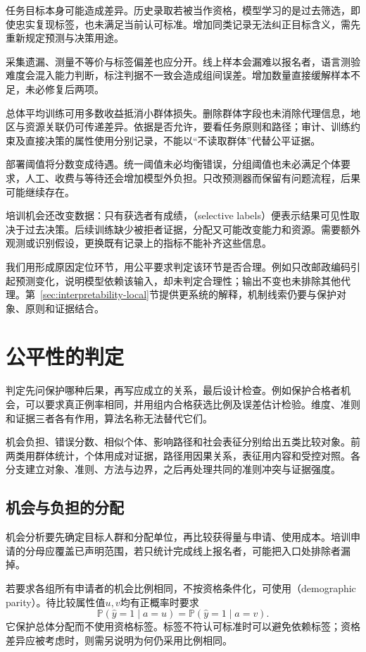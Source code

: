 任务目标本身可能造成差异。历史录取若被当作资格，模型学习的是过去筛选，即使忠实复现标签，也未满足当前认可标准。增加同类记录无法纠正目标含义，需先重新规定预测与决策用途。

采集遗漏、测量不等价与标签偏差也应分开。线上样本会漏难以报名者，语言测验难度会混入能力判断，标注判据不一致会造成组间误差。增加数量直接缓解样本不足，未必修复后两项。

总体平均训练可用多数收益抵消小群体损失。删除群体字段也未消除代理信息，地区与资源关联仍可传递差异。依据是否允许，要看任务原则和路径；审计、训练约束及直接决策的属性使用分别记录，不能以“不读取群体”代替公平证据。

部署阈值将分数变成待遇。统一阈值未必均衡错误，分组阈值也未必满足个体要求，人工、收费与等待还会增加模型外负担。只改预测器而保留有问题流程，后果可能继续存在。

培训机会还改变数据：只有获选者有成绩，（selective labels）便表示结果可见性取决于过去决策。后续训练缺少被拒者证据，分配又可能改变能力和资源。需要额外观测或识别假设，更换既有记录上的指标不能补齐这些信息。

我们用形成原因定位环节，用公平要求判定该环节是否合理。例如只改邮政编码引起预测变化，说明模型依赖该输入，却未判定合理性；输出不变也未排除其他代理。第~\ref{sec:interpretability-local}节提供更系统的解释，机制线索仍要与保护对象、原则和证据结合。

\section{公平性的判定}
\label{sec:fairness-criteria}

判定先问保护哪种后果，再写应成立的关系，最后设计检查。例如保护合格者机会，可以要求真正例率相同，并用组内合格获选比例及误差估计检验。维度、准则和证据三者各有作用，算法名称无法替代它们。

机会负担、错误分数、相似个体、影响路径和社会表征分别给出五类比较对象。前两类用群体统计，个体用成对证据，路径用因果关系，表征用内容和受控对照。各分支建立对象、准则、方法与边界，之后再处理共同的准则冲突与证据强度。

\subsection{机会与负担的分配}
\label{sec:fairness-group-comparison}

机会分析要先确定目标人群和分配单位，再比较获得量与申请、使用成本。培训申请的分母应覆盖已声明范围，若只统计完成线上报名者，可能把入口处排除者漏掉。

若要求各组所有申请者的机会比例相同，不按资格条件化，可使用（demographic parity）。待比较属性值$u,v$均有正概率时要求
\[
 \mathbb P(\hat y=1\mid a=u)
 =\mathbb P(\hat y=1\mid a=v).
\]
它保护总体分配而不使用资格标签。标签不符认可标准时可以避免依赖标签；资格差异应被考虑时，则需另说明为何仍采用比例相同。

